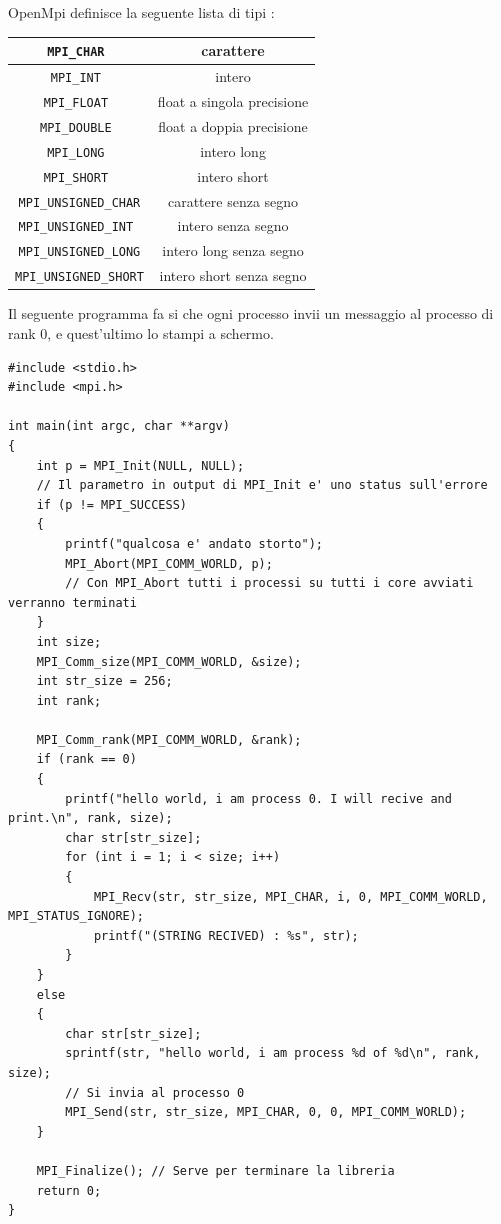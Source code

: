 \documentclass[10pt, letterpaper]{report}
\begin{document}
OpenMpi definisce la seguente lista di tipi  :\begin{center}
    \begin{tabular}{|c|c|}
        \hline
        \rowcolor[HTML]{EFEFEF} 
        \texttt{MPI\_CHAR }           & carattere                  \\ \hline
        \texttt{MPI\_INT }            & intero                     \\ \hline
        \rowcolor[HTML]{EFEFEF} 
        \texttt{MPI\_FLOAT  }         & float a singola precisione \\ \hline
        \texttt{MPI\_DOUBLE  }        & float a doppia precisione  \\ \hline
        \rowcolor[HTML]{EFEFEF} 
        \texttt{MPI\_LONG }           & intero long                \\ \hline
        \texttt{MPI\_SHORT }          & intero short               \\ \hline
        \rowcolor[HTML]{EFEFEF} 
        \texttt{MPI\_UNSIGNED\_CHAR}  & carattere senza segno      \\ \hline
        \texttt{MPI\_UNSIGNED\_INT }  & intero senza segno         \\ \hline
        \rowcolor[HTML]{EFEFEF} 
        \texttt{MPI\_UNSIGNED\_LONG}  & intero long senza segno    \\ \hline
        \texttt{MPI\_UNSIGNED\_SHORT} & intero short senza segno   \\ \hline
        \end{tabular}
\end{center}
Il seguente programma fa si che ogni processo invii un messaggio al processo di rank 0, e quest'ultimo lo stampi 
a schermo.
\begin{lstlisting}[style=CStyle]
#include <stdio.h>
#include <mpi.h>

int main(int argc, char **argv)
{
    int p = MPI_Init(NULL, NULL);
    // Il parametro in output di MPI_Init e' uno status sull'errore
    if (p != MPI_SUCCESS)
    {
        printf("qualcosa e' andato storto");
        MPI_Abort(MPI_COMM_WORLD, p);
        // Con MPI_Abort tutti i processi su tutti i core avviati verranno terminati
    }
    int size;
    MPI_Comm_size(MPI_COMM_WORLD, &size);
    int str_size = 256;
    int rank;

    MPI_Comm_rank(MPI_COMM_WORLD, &rank);
    if (rank == 0)
    {
        printf("hello world, i am process 0. I will recive and print.\n", rank, size);
        char str[str_size];
        for (int i = 1; i < size; i++)
        {
            MPI_Recv(str, str_size, MPI_CHAR, i, 0, MPI_COMM_WORLD, MPI_STATUS_IGNORE);
            printf("(STRING RECIVED) : %s", str);
        }
    }
    else
    {
        char str[str_size];
        sprintf(str, "hello world, i am process %d of %d\n", rank, size);
        // Si invia al processo 0
        MPI_Send(str, str_size, MPI_CHAR, 0, 0, MPI_COMM_WORLD);
    }

    MPI_Finalize(); // Serve per terminare la libreria
    return 0;
}
\end{lstlisting}
\end{document}
